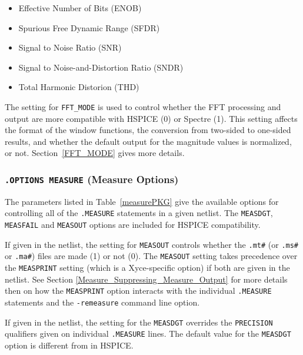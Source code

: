 {{\begin{itemize}
  \item Effective Number of Bits (ENOB)
  \item Spurious Free Dynamic Range (SFDR)
  \item Signal to Noise Ratio (SNR)
  \item Signal to Noise-and-Distortion Ratio (SNDR)
  \item Total Harmonic Distorion (THD)
\end{itemize}

The setting for \texttt{FFT\_MODE} is used to control whether the \Xyce{} FFT
processing and output are more compatible with HSPICE (0) or Spectre (1).
This setting affects the format of the window functions, the conversion from
two-sided to one-sided results, and whether the default output for the
magnitude values is normalized, or not.  Section~\ref{FFT_MODE} gives
more details.



\subsubsection{\texttt{.OPTIONS MEASURE} (Measure Options)}
The parameters listed in Table~\ref{measurePKG} give the available
options for controlling all of the \texttt{.MEASURE} statements in
a given \Xyce{} netlist.  The \texttt{MEASDGT}, \texttt{MEASFAIL}
and \texttt{MEASOUT} options are included for HSPICE compatibility.

If given in the netlist, the setting for \texttt{MEASOUT} controls whether 
the \texttt{.mt\#} (or \texttt{.ms\#} or \texttt{.ma\#}) files are made (1) or not (0). 
The \texttt{MEASOUT} setting takes precedence over the \texttt{MEASPRINT} setting 
(which is a Xyce-specific option) if both are given in the netlist.
See Section \ref{Measure_Suppressing_Measure_Output} for more details then on 
how the \texttt{MEASPRINT} option interacts with the individual 
\texttt {.MEASURE} statements and the \texttt{-remeasure} command 
line option.

If given in the netlist, the setting for the \texttt{MEASDGT} overrides the 
\texttt{PRECISION} qualifiers given on individual \texttt{.MEASURE} lines. 
The default value for the \texttt{MEASDGT} option is different from in HSPICE.

}}
